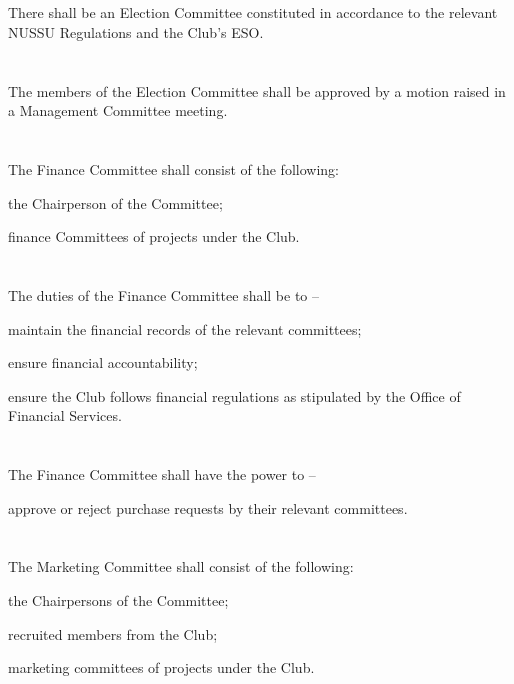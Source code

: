 
\section{}
There shall be an Election Committee constituted in accordance to the relevant NUSSU Regulations and the Club’s ESO.

\section{}
The members of the Election Committee shall be approved by a motion raised in a Management Committee meeting.

\section{}
The Finance Committee shall consist of the following:
	\begin{legal}
	\item the Chairperson of the Committee;
	\item finance Committees of projects under the Club.
	\end{legal}

\section{}
The duties of the Finance Committee shall be to –
	\begin{legal}
	\item maintain the financial records of the relevant committees;
	\item ensure financial accountability;
	\item ensure the Club follows financial regulations as stipulated by the Office of Financial Services.
	\end{legal}

\section{}
The Finance Committee shall have the power to –
	\begin{legal}
	\item approve or reject purchase requests by their relevant committees.
	\end{legal}

\section{}
The Marketing Committee shall consist of the following:
	\begin{legal}
	\item the Chairpersons of the Committee;
	\item recruited members from the Club;
	\item marketing committees of projects under the Club.
	\end{legal}

